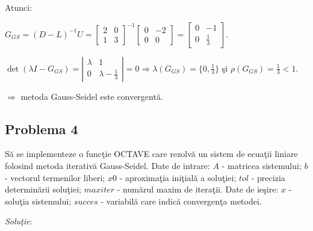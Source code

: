 \documentclass{exam}
\theoremstyle{definition}
\newcommand{\octavescript}[2]{
	
}
\begin{document}
Atunci:

${G}_{GS} = {(D-L)}^{-1}U =
	\left[ {\begin{array}{cc}
					2 & 0 \\
					1 & 3
				\end{array} } \right] ^ {-1}
	\left[ {\begin{array}{cc}
					0 & -2 \\
					0 & 0
				\end{array} } \right]
	=
	\left[ {\begin{array}{cc}
					0 & -1          \\
					0 & \frac{1}{3}
				\end{array} } \right]$.

$\det{(\lambda I - G_{GS})} = \left| {\begin{array}{cc}
		\lambda & 1                     \\
		0       & \lambda - \frac{1}{3}
	\end{array} } \right| = 0\Rightarrow \lambda(G_{GS}) = \{0,\frac{1}{3}\}$  \c{s}i $\rho(G_{GS}) = \frac{1}{3} < 1$.

$\Rightarrow$ metoda Gauss-Seidel este convergent\u{a}.


\subsection{Problema 4}
S\u{a} se implementeze o func\c{t}ie OCTAVE care rezolv\u{a} un sistem de ecua\c{t}ii liniare folosind metoda iterativ\u{a} Gauss-Seidel. Date de intrare: $A$ - matricea sistemului; $b$ - vectorul termenilor liberi; $x0$ - aproxima\c{t}ia ini\c{t}ial\u{a} a solu\c{t}iei; $tol$ - precizia determin\u{a}rii solu\c{t}iei; $maxiter$ - num\u{a}rul maxim de itera\c{t}ii. Date de ie\c{s}ire: $x$ - solu\c{t}ia sistemului; $succes$ - variabilă care indică convergenţa metodei.

\textit{Solu\c{t}ie}:

\octavescript{./src/GaussSeidel.m}{}
\end{document}
